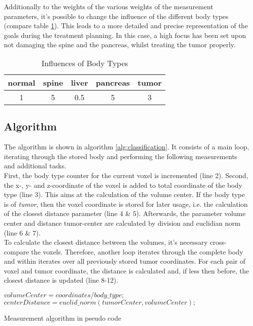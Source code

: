 Additionally to the weights of the various weights of the measurement parameters, it's possible to change the influence of the different body types (compare table \ref{tbl:classification_type_weights}). This leads to a more detailed and precise representation of the goals during the treatment planning. In this case, a high focus has been set upon not damaging the spine and the pancreas, whilst treating the tumor properly. 

\begin{table}
\centering
\caption{Influences of Body Types}
\begin{tabular}[htbp]{c | c | c | c | c}
\textbf{normal} & \textbf{spine} & \textbf{liver} & \textbf{pancreas} & \textbf{tumor} \\ \hline
1 & 5 & 0.5 & 5 & 3
\end{tabular}
\label{tbl:classification_type_weights}
\end{table}

\subsection{Algorithm}\label{classification:algorithm}
The algorithm is shown in algorithm \ref{alg:classification}. It consists of a main loop, iterating through the stored body and performing the following measurements and additional tasks. \\
First, the body type counter for the current voxel is incremented (line 2). Second, the x-, y- and z-coordinate of the voxel is added to total coordinate of the body type (line 3). This aims at the calculation of the volume center. If the body type is of \textit{tumor}, then the voxel coordinate is stored for later usage, i.e. the calculation of the closest distance parameter (line 4 \& 5). Afterwards, the parameter volume center and distance tumor-center are calculated by division and euclidian norm (line 6 \& 7).\\
To calculate the closest distance between the volumes, it's necessary cross-compare the voxels. Therefore, another loop iterates through the complete body and within iterates over all previously stored tumor coordinates. For each pair of voxel and tumor coordinate, the distance is calculated and, if less then before, the closest distance is updated (line 8-12).

\begin{algorithm}
$volumeCenter = coordinates / body\_type;$ \\
$centerDistance = euclid\_norm (tumorCenter, volumeCenter);$ \\
\caption{Measurement algorithm in pseudo code}
\label{alg:classification}
\end{algorithm}

